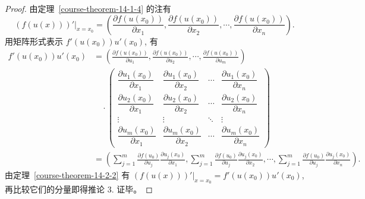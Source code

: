 \documentclass[UTF8,12pt,a4paper,fontset=fandol]{ctexart}
\begin{document}
\begin{proof}\quad 由定理~\ref{course-theorem-14-1-4}  的注有
\[
  \left.(f(u(x)))'\right|_{x=x_0}
  =\left(
  \frac{\partial f(u(x_0))}{\partial x_1},
  \frac{\partial f(u(x_0))}{\partial x_2},
  \cdots,
  \frac{\partial f(u(x_0))}{\partial x_n}
  \right).
\]
用矩阵形式表示 $f'(u(x_0))u'(x_0)$, 有
\[
\begin{aligned}
  f'(u(x_0))u'(x_0)
  &=
  \left(
  \frac{\partial f(u(x_0))}{\partial u_1},
  \frac{\partial f(u(x_0))}{\partial u_2},
  \cdots,
  \frac{\partial f(u(x_0))}{\partial u_m}
  \right)\\
  &\quad\cdot
  \begin{pmatrix}
    \dfrac{\partial u_1(x_0)}{\partial x_1}&\dfrac{\partial u_1(x_0)}{\partial x_2}&\cdots&\dfrac{\partial u_1(x_0)}{\partial x_n}\\
    \dfrac{\partial u_2(x_0)}{\partial x_1}&\dfrac{\partial u_2(x_0)}{\partial x_2}&\cdots&\dfrac{\partial u_2(x_0)}{\partial x_n}\\
    \vdots&\vdots&\ddots&\vdots\\
    \dfrac{\partial u_m(x_0)}{\partial x_1}&\dfrac{\partial u_m(x_0)}{\partial x_2}&\cdots&\dfrac{\partial u_m(x_0)}{\partial x_n}
  \end{pmatrix}\\
  &=
  \left(
  \sum_{j=1}^m\frac{\partial f(u_0)}{\partial u_j}\frac{\partial u_j(x_0)}{\partial x_1},
  \sum_{j=1}^m\frac{\partial f(u_0)}{\partial u_j}\frac{\partial u_j(x_0)}{\partial x_2},
  \cdots,
  \sum_{j=1}^m\frac{\partial f(u_0)}{\partial u_j}\frac{\partial u_j(x_0)}{\partial x_n}
  \right).
\end{aligned}
\]
由定理~\ref{course-theorem-14-2-2}  有 $\left.(f(u(x)))'\right|_{x=x_0}=f'(u(x_0))u'(x_0)$, 再比较它们的分量即得推论 3. 证毕。

\end{proof}
\end{document}
